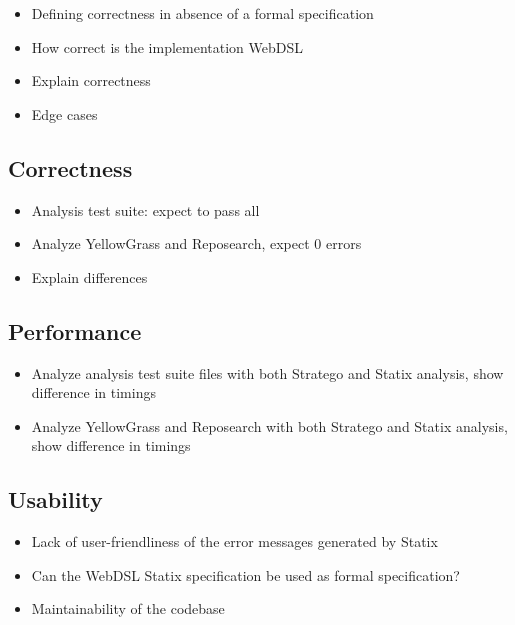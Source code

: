   \begin{itemize}
    \item Defining correctness in absence of a formal specification
    \item How correct is the implementation WebDSL
    \item Explain correctness
    \item Edge cases
  \end{itemize}

  \subsection{Correctness}

    \begin{itemize}
      \item Analysis test suite: expect to pass all
      \item Analyze YellowGrass and Reposearch, expect 0 errors
      \item Explain differences
    \end{itemize}

  \subsection{Performance}

    \begin{itemize}
      \item Analyze analysis test suite files with both Stratego and Statix analysis, show difference in timings
      \item Analyze YellowGrass and Reposearch with both Stratego and Statix analysis, show difference in timings
    \end{itemize}

  \subsection{Usability}

    \begin{itemize}
      \item Lack of user-friendliness of the error messages generated by Statix
      \item Can the WebDSL Statix specification be used as formal specification?
      \item Maintainability of the codebase
    \end{itemize}
